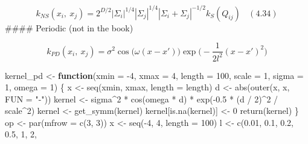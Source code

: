 \documentclass[
]{article}
\newenvironment{Shaded}{\begin{snugshade}}{\end{snugshade}}
\newcommand{\AttributeTok}[1]{\textcolor[rgb]{0.77,0.63,0.00}{#1}}
\newcommand{\ControlFlowTok}[1]{\textcolor[rgb]{0.13,0.29,0.53}{\textbf{#1}}}
\newcommand{\DecValTok}[1]{\textcolor[rgb]{0.00,0.00,0.81}{#1}}
\newcommand{\FloatTok}[1]{\textcolor[rgb]{0.00,0.00,0.81}{#1}}
\newcommand{\FunctionTok}[1]{\textcolor[rgb]{0.00,0.00,0.00}{#1}}
\newcommand{\NormalTok}[1]{#1}
\newcommand{\OtherTok}[1]{\textcolor[rgb]{0.56,0.35,0.01}{#1}}
\newcommand{\SpecialCharTok}[1]{\textcolor[rgb]{0.00,0.00,0.00}{#1}}
\newcommand{\StringTok}[1]{\textcolor[rgb]{0.31,0.60,0.02}{#1}}
\begin{document}
\[
k_{NS}(x_i,\ x_j) = 2^{D/2}|\Sigma_i|^{1/4}
|\Sigma_j|^{1/4}|\Sigma_i + \Sigma_j|^{-1/2}k_S(Q_{ij})
\ \ \ \ (4.34)
\] \#\#\#\# Periodic (not in the book)

\[
k_{PD}(x_i,\ x_j) = \sigma^2\cos\big(\omega(x - x')\big) \exp\Big(-\frac 1 {2l^2}(x - x')^2\Big)
\]

\begin{Shaded}
\begin{Highlighting}[]
\NormalTok{kernel\_pd }\OtherTok{\textless{}{-}} \ControlFlowTok{function}\NormalTok{(}\AttributeTok{xmin =} \SpecialCharTok{{-}}\DecValTok{4}\NormalTok{,}
                      \AttributeTok{xmax =} \DecValTok{4}\NormalTok{,}
                      \AttributeTok{length =} \DecValTok{100}\NormalTok{,}
                      \AttributeTok{scale =} \DecValTok{1}\NormalTok{,}
                      \AttributeTok{sigma =} \DecValTok{1}\NormalTok{,}
                      \AttributeTok{omega =} \DecValTok{1}\NormalTok{) \{}
\NormalTok{  x }\OtherTok{\textless{}{-}} \FunctionTok{seq}\NormalTok{(xmin, xmax, }\AttributeTok{length =}\NormalTok{ length)}
\NormalTok{  d }\OtherTok{\textless{}{-}} \FunctionTok{abs}\NormalTok{(}\FunctionTok{outer}\NormalTok{(x, x, }\AttributeTok{FUN =} \StringTok{"{-}"}\NormalTok{))}
\NormalTok{  kernel }\OtherTok{\textless{}{-}}\NormalTok{ sigma}\SpecialCharTok{\^{}}\DecValTok{2} \SpecialCharTok{*} \FunctionTok{cos}\NormalTok{(omega }\SpecialCharTok{*}\NormalTok{ d) }\SpecialCharTok{*}
    \FunctionTok{exp}\NormalTok{(}\SpecialCharTok{{-}}\FloatTok{0.5} \SpecialCharTok{*}\NormalTok{ (d }\SpecialCharTok{/} \DecValTok{2}\NormalTok{)}\SpecialCharTok{\^{}}\DecValTok{2} \SpecialCharTok{/}\NormalTok{ scale}\SpecialCharTok{\^{}}\DecValTok{2}\NormalTok{)}
\NormalTok{  kernel }\OtherTok{\textless{}{-}} \FunctionTok{get\_symm}\NormalTok{(kernel)}
\NormalTok{  kernel[}\FunctionTok{is.na}\NormalTok{(kernel)] }\OtherTok{\textless{}{-}} \DecValTok{0}
  \FunctionTok{return}\NormalTok{(kernel)}
\NormalTok{\}}
\NormalTok{op }\OtherTok{\textless{}{-}} \FunctionTok{par}\NormalTok{(}\AttributeTok{mfrow =} \FunctionTok{c}\NormalTok{(}\DecValTok{3}\NormalTok{, }\DecValTok{3}\NormalTok{))}
\NormalTok{x }\OtherTok{\textless{}{-}} \FunctionTok{seq}\NormalTok{(}\SpecialCharTok{{-}}\DecValTok{4}\NormalTok{, }\DecValTok{4}\NormalTok{, }\AttributeTok{length =} \DecValTok{100}\NormalTok{)}
\NormalTok{l }\OtherTok{\textless{}{-}} \FunctionTok{c}\NormalTok{(}\FloatTok{0.01}\NormalTok{, }\FloatTok{0.1}\NormalTok{, }\FloatTok{0.2}\NormalTok{,}
        \FloatTok{0.5}\NormalTok{, }\DecValTok{1}\NormalTok{, }\DecValTok{2}\NormalTok{,}

\end{Highlighting}
\end{Shaded}
\end{document}
